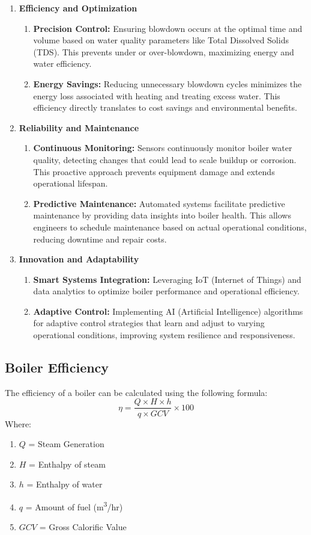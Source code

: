 \begin{enumerate}
    \item \textbf{Efficiency and Optimization}
    \begin{enumerate}
        \item \textbf{Precision Control:} Ensuring blowdown occurs at the optimal time and volume based on water quality parameters like Total Dissolved Solids (TDS). This prevents under or over-blowdown, maximizing energy and water efficiency.
        \item \textbf{Energy Savings:} Reducing unnecessary blowdown cycles minimizes the energy loss associated with heating and treating excess water. This efficiency directly translates to cost savings and environmental benefits.
    \end{enumerate}
    \item \textbf{Reliability and Maintenance}
    \begin{enumerate}
        \item \textbf{Continuous Monitoring:} Sensors continuously monitor boiler water quality, detecting changes that could lead to scale buildup or corrosion. This proactive approach prevents equipment damage and extends operational lifespan.
        \item \textbf{Predictive Maintenance:} Automated systems facilitate predictive maintenance by providing data insights into boiler health. This allows engineers to schedule maintenance based on actual operational conditions, reducing downtime and repair costs.
    \end{enumerate}
    \item \textbf{Innovation and Adaptability}
    \begin{enumerate}
        \item \textbf{Smart Systems Integration:} Leveraging IoT (Internet of Things) and data analytics to optimize boiler performance and operational efficiency.
        \item \textbf{Adaptive Control:} Implementing AI (Artificial Intelligence) algorithms for adaptive control strategies that learn and adjust to varying operational conditions, improving system resilience and responsiveness.
    \end{enumerate}
\end{enumerate}

\subsection{Boiler Efficiency}
The efficiency of a boiler can be calculated using the following formula:
\begin{equation}
\eta = \frac{Q \times H \times h}{q \times GCV} \times 100%
\end{equation}
Where:
\begin{enumerate}
\item $Q$ = Steam Generation
\item $H$ = Enthalpy of steam
\item $h$ = Enthalpy of water
\item $q$ = Amount of fuel (m\textsuperscript{3}/hr)
\item $GCV$ = Gross Calorific Value
\end{enumerate}
